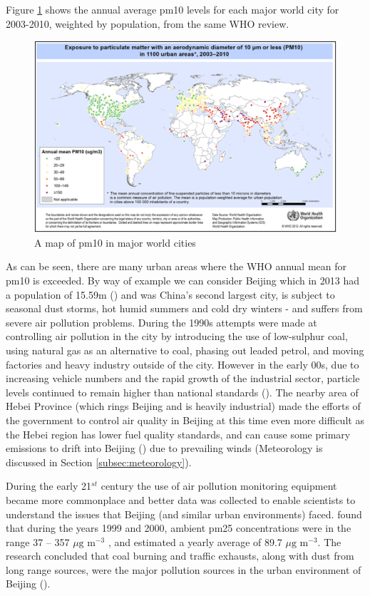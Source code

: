 Figure \ref{fig:mapofpm10} shows the annual average \gls{pm10} levels for each major world city for 2003-2010, weighted by population, from the same WHO review.

\begin{figure}[H]
\centering
\includegraphics[scale=0.8]{images/who_pm10_world_map}
\caption{A map of \gls{pm10} in major world cities}
\label{fig:mapofpm10}
\end{figure}

As can be seen, there are many urban areas where the WHO annual mean for \gls{pm10} is exceeded. By way of example we can consider Beijing which in 2013 had a population of 15.59m (\cite{TheUnitedNationsStatisticsDivision2013}) and was China's second largest city, is subject to seasonal dust storms, hot humid summers and cold dry winters - and suffers from severe air pollution problems. During the 1990s attempts were made at controlling air pollution in the city by introducing the use of low-sulphur coal, using natural gas as an alternative to coal, phasing out leaded petrol, and moving factories and heavy industry outside of the city. However in the early 00s, due to increasing vehicle numbers and the rapid growth of the industrial sector, particle levels continued to remain higher than national standards (\cite{Sun2004}). The nearby area of Hebei Province (which rings Beijing and is heavily industrial) made the efforts of the government to control air quality in Beijing at this time even more difficult as the Hebei region has lower fuel quality standards, and can cause some primary emissions to drift into Beijing (\cite{Tuo2013}) due to prevailing winds (Meteorology is discussed in Section \ref{subsec:meteorology}).

During the early 21$^{st}$ century the use of air pollution monitoring equipment became more commonplace and better data was collected to enable scientists to understand the issues that Beijing (and similar urban environments) faced. \cite{Sun2004} found that during the years 1999 and 2000, ambient \gls{pm25} concentrations were in the range 37 -- 357 $\mu \text{g m}^{-3}$ , and estimated a yearly average of 89.7 $\mu \text{g m}^{-3}$.  The research concluded that coal burning and traffic exhausts, along with dust from long range sources, were the major pollution sources in the urban environment of Beijing (\cite{Sun2004}).

